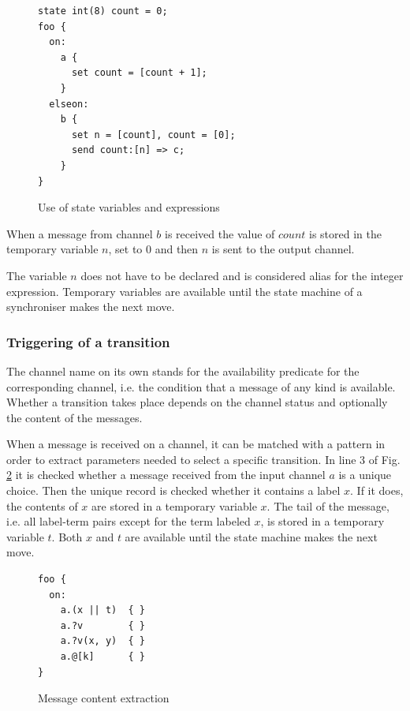 \begin{figure}[h!]
\lstset{numbers=left, numberstyle=\small, stepnumber=1, numbersep=8pt}
\begin{lstlisting}[frame=single]
state int(8) count = 0;
foo {
  on:
    a {
      set count = [count + 1];
    }
  elseon:
    b {
      set n = [count], count = [0];
      send count:[n] => c;
    }
}
\end{lstlisting}
\caption{Use of state variables and expressions}
\label{sync_state_exp}
\end{figure}

When a message from channel $b$ is received the value of $count$ is stored in the temporary variable $n$, set to 0 and then $n$ is sent to the output channel.

The variable $n$ does not have to be declared and is considered alias for the integer expression. Temporary variables are available until the state machine of a synchroniser makes the next move.


  \subsubsection{Triggering of a transition}
The channel name on its own stands for the availability predicate for the corresponding channel, i.e. the condition that a message of any kind is available. Whether a transition takes place depends on the channel status and optionally the content of the messages.

When a message is received on a channel, it can be matched with a pattern in order to extract parameters needed to select a specific transition. In line 3 of Fig. \ref{sync_trans} it is checked whether a message received from the input channel $a$ is a unique choice. Then the unique record is checked whether it contains a label $x$. If it does, the contents of $x$ are stored in a temporary variable $x$. The tail of the message, i.e. all label-term pairs except for the term labeled $x$, is stored in a temporary variable $t$. Both $x$ and $t$ are available until the state machine makes the next move. %

\begin{figure}[h!]
\lstset{numbers=left, numberstyle=\small, stepnumber=1, numbersep=8pt}
\begin{lstlisting}[frame=single]
foo {
  on:
    a.(x || t)  { }
    a.?v        { }
    a.?v(x, y)  { }
    a.@[k]      { }
}
\end{lstlisting}
\caption{Message content extraction}
\label{sync_trans}
\end{figure}

